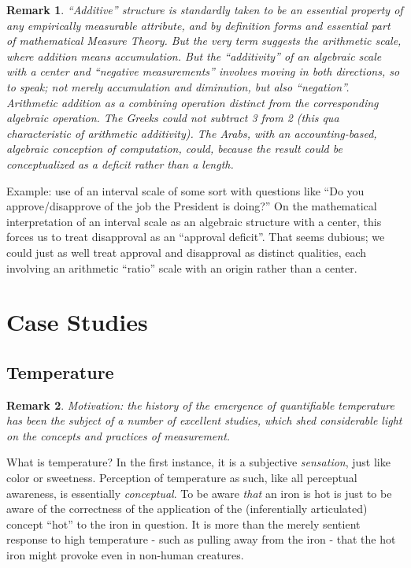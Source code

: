\documentclass[11pt,twoside]{article}
\newtheorem{remark}{Remark}
\begin{document}
\begin{remark}
``Additive'' structure is standardly taken to be an essential property
  of any empirically measurable attribute, and by definition forms and
  essential part of mathematical Measure Theory.  But the very term
  suggests the arithmetic scale, where addition means accumulation.
  But the ``additivity'' of an algebraic scale with a center and
  ``negative measurements'' involves moving in both directions, so to
  speak; not merely accumulation and diminution, but also
  ``negation''.  Arithmetic addition as a combining operation distinct
  from the corresponding algebraic operation.  The Greeks could not
  subtract 3 from 2 (this qua characteristic of arithmetic
  additivity).  The Arabs, with an accounting-based, algebraic
  conception of computation, could, because the result could be
  conceptualized as a deficit rather than a length.
\end{remark}

Example: use of an interval scale of some sort with questions like
``Do you approve/disapprove of the job the President is doing?''  On
the mathematical interpretation of an interval scale as an algebraic
structure with a center, this forces us to treat disapproval as an
``approval deficit''.  That seems dubious; we could just as well treat
approval and disapproval as distinct qualities, each involving an
arithmetic ``ratio'' scale with an origin rather than a center.


\clearpage
\section{Case Studies}

\subsection{Temperature}

\begin{remark}
  Motivation: the history of the emergence of quantifiable temperature
  has been the subject of a number of excellent studies, which shed
  considerable light on the concepts and practices of measurement.
\end{remark}

What is temperature?  In the first instance, it is a subjective
\textit{sensation}, just like color or sweetness.  Perception of
temperature as such, like all perceptual awareness, is essentially
\textit{conceptual}.  To be aware \textit{that} an iron is hot is just
to be aware of the correctness of the application of the
(inferentially articulated) concept ``hot'' to the iron in question.
It is more than the merely sentient response to high temperature -
such as pulling away from the iron - that the hot iron might provoke
even in non-human creatures.
\end{document}
